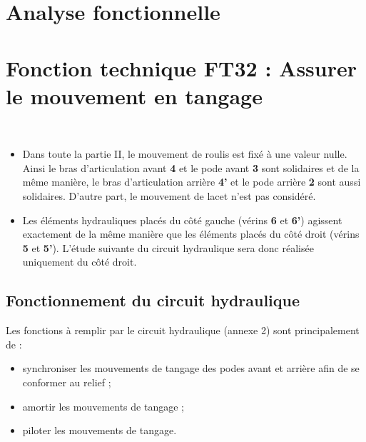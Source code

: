 \fi

\section{Analyse fonctionnelle \label{sec:1}}
\ifprof
\begin{corrige}
\end{corrige}
\else
\fi



\section{Fonction technique FT32 : Assurer le mouvement en tangage \label{sec:2}}

\begin{hypo}~\\
\begin{itemize}
\item Dans toute la partie II, le mouvement de roulis est fixé à une valeur nulle. Ainsi le bras d’articulation avant \textbf{4} et le pode avant \textbf{3} sont solidaires et de la même manière, le bras d’articulation arrière \textbf{4’} et le pode arrière \textbf{2} sont aussi solidaires. D’autre part, le mouvement de lacet n’est pas considéré.
\item Les éléments hydrauliques placés du côté gauche (vérins \textbf{6} et \textbf{6’}) agissent exactement de la même manière que les éléments placés du côté droit (vérins \textbf{5} et \textbf{5’}). L’étude suivante du circuit hydraulique sera donc réalisée uniquement du côté droit.
\end{itemize}
\end{hypo}

\subsection{Fonctionnement du circuit hydraulique}
\ifprof
\else
Les fonctions à remplir par le circuit hydraulique (annexe 2) sont principalement de :
\begin{itemize}
\item synchroniser les mouvements de tangage des podes avant et arrière afin de se conformer au relief ;
\item amortir les mouvements de tangage ;
\item piloter les mouvements de tangage.
\end{itemize}
\fi

